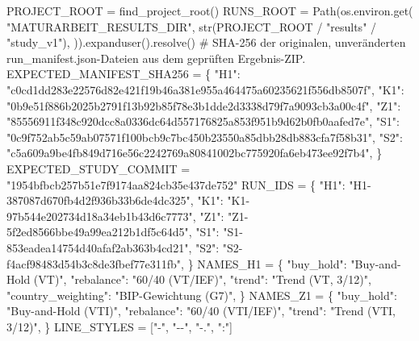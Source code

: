 \documentclass[
  ngerman,
  a4paper,
  DIV=11,
  oneside]{scrreprt}
\newenvironment{Shaded}{\begin{snugshade}}{\end{snugshade}}
\newcommand{\BuiltInTok}[1]{\textcolor[rgb]{0.00,0.23,0.31}{#1}}
\newcommand{\CommentTok}[1]{\textcolor[rgb]{0.37,0.37,0.37}{#1}}
\newcommand{\NormalTok}[1]{\textcolor[rgb]{0.00,0.23,0.31}{#1}}
\newcommand{\OperatorTok}[1]{\textcolor[rgb]{0.37,0.37,0.37}{#1}}
\newcommand{\StringTok}[1]{\textcolor[rgb]{0.13,0.47,0.30}{#1}}
\begin{document}
\begin{Shaded}
\begin{Highlighting}[]
\NormalTok{PROJECT\_ROOT }\OperatorTok{=}\NormalTok{ find\_project\_root()}
\NormalTok{RUNS\_ROOT }\OperatorTok{=}\NormalTok{ Path(os.environ.get(}
    \StringTok{"MATURARBEIT\_RESULTS\_DIR"}\NormalTok{,}
    \BuiltInTok{str}\NormalTok{(PROJECT\_ROOT }\OperatorTok{/} \StringTok{"results"} \OperatorTok{/} \StringTok{"study\_v1"}\NormalTok{),}
\NormalTok{)).expanduser().resolve()}
\CommentTok{\# SHA{-}256 der originalen, unveränderten run\_manifest.json{-}Dateien aus dem geprüften Ergebnis{-}ZIP.}
\NormalTok{EXPECTED\_MANIFEST\_SHA256 }\OperatorTok{=}\NormalTok{ \{}
    \StringTok{"H1"}\NormalTok{: }\StringTok{"c0cd1dd283e22576d82e421f19b46a381e955a464475a60235621f556db8507f"}\NormalTok{,}
    \StringTok{"K1"}\NormalTok{: }\StringTok{"0b9e51f886b2025b2791f13b92b85f78e3b1dde2d3338d79f7a9093cb3a00c4f"}\NormalTok{,}
    \StringTok{"Z1"}\NormalTok{: }\StringTok{"85556911f348c920dcc8a0336dc64d557176825a853f951b9d62b0fb0aafed7e"}\NormalTok{,}
    \StringTok{"S1"}\NormalTok{: }\StringTok{"0c9f752ab5c59ab07571f100bcb9c7bc450b23550a85dbb28db883cfa7f58b31"}\NormalTok{,}
    \StringTok{"S2"}\NormalTok{: }\StringTok{"c5a609a9be4fb849d716e56c2242769a80841002bc775920fa6eb473ee92f7b4"}\NormalTok{,}
\NormalTok{\}}
\NormalTok{EXPECTED\_STUDY\_COMMIT }\OperatorTok{=} \StringTok{"1954bfbcb257b51e7f9174aa824cb35e437de752"}
\NormalTok{RUN\_IDS }\OperatorTok{=}\NormalTok{ \{}
    \StringTok{"H1"}\NormalTok{: }\StringTok{"H1{-}387087d670fb4d2f936b33b6de4dc325"}\NormalTok{,}
    \StringTok{"K1"}\NormalTok{: }\StringTok{"K1{-}97b544e202734d18a34eb1b43d6c7773"}\NormalTok{,}
    \StringTok{"Z1"}\NormalTok{: }\StringTok{"Z1{-}5f2ed8566bbe49a99ea212b1df5c64d5"}\NormalTok{,}
    \StringTok{"S1"}\NormalTok{: }\StringTok{"S1{-}853eadea14754d40afaf2ab363b4cd21"}\NormalTok{,}
    \StringTok{"S2"}\NormalTok{: }\StringTok{"S2{-}f4acf98483d54b3c8de3fbef77e311fb"}\NormalTok{,}
\NormalTok{\}}
\NormalTok{NAMES\_H1 }\OperatorTok{=}\NormalTok{ \{}
    \StringTok{"buy\_hold"}\NormalTok{: }\StringTok{"Buy{-}and{-}Hold (VT)"}\NormalTok{,}
    \StringTok{"rebalance"}\NormalTok{: }\StringTok{"60/40 (VT/IEF)"}\NormalTok{,}
    \StringTok{"trend"}\NormalTok{: }\StringTok{"Trend (VT, 3/12)"}\NormalTok{,}
    \StringTok{"country\_weighting"}\NormalTok{: }\StringTok{"BIP{-}Gewichtung (G7)"}\NormalTok{,}
\NormalTok{\}}
\NormalTok{NAMES\_Z1 }\OperatorTok{=}\NormalTok{ \{}
    \StringTok{"buy\_hold"}\NormalTok{: }\StringTok{"Buy{-}and{-}Hold (VTI)"}\NormalTok{,}
    \StringTok{"rebalance"}\NormalTok{: }\StringTok{"60/40 (VTI/IEF)"}\NormalTok{,}
    \StringTok{"trend"}\NormalTok{: }\StringTok{"Trend (VTI, 3/12)"}\NormalTok{,}
\NormalTok{\}}
\NormalTok{LINE\_STYLES }\OperatorTok{=}\NormalTok{ [}\StringTok{"{-}"}\NormalTok{, }\StringTok{"{-}{-}"}\NormalTok{, }\StringTok{"{-}."}\NormalTok{, }\StringTok{":"}\NormalTok{]}



\end{Highlighting}
\end{Shaded}
\end{document}
